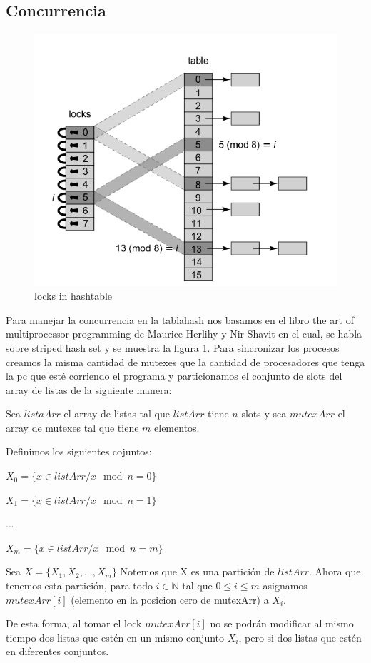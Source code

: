 \documentclass{article}
\begin{document}
\subsection{Concurrencia}
\begin{figure}[ht]    
    \centering
    \includegraphics[width=0.7\linewidth]{concurrenciaHT.png}
    \caption{locks in hashtable}
    \label{}
\end{figure}

Para manejar la concurrencia en la tablahash nos basamos en el libro
the art of multiprocessor programming de Maurice Herlihy y Nir Shavit
en el cual, se habla sobre striped hash set y se muestra la figura 1.
Para sincronizar los procesos creamos la misma cantidad de mutexes
que la cantidad de procesadores que tenga la pc que esté corriendo
el programa y particionamos el conjunto de slots del array de listas
de la siguiente manera:

Sea $listaArr$ el array de listas tal que $listArr$ tiene $n$ slots y sea $mutexArr$ el array de mutexes tal que tiene
$m$ elementos.

Definimos los siguientes cojuntos:

$X_0 =\{x\in listArr/x\mod n=0\}$

$X_1 =\{x\in listArr/x \mod n=1\}$

...

$X_m =\{x\in listArr/x \mod n=m\}$ 

Sea $X = \{X_1, X_2, ... , X_m\}$
Notemos que X es una partición de $listArr$. Ahora que
tenemos esta partición, para todo $i\in \mathbb{N}$ tal que
$0 \leq i \leq m$
asignamos $mutexArr[i]$ (elemento
en la posicion cero de mutexArr) a $X_i$.

De esta forma, al tomar el lock $mutexArr[i]$ no
se podrán modificar al mismo tiempo dos
listas que estén en un mismo conjunto $X_i$, pero si
dos listas que estén en diferentes conjuntos.
\end{document}
